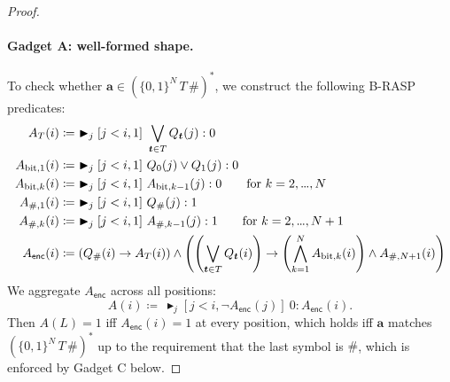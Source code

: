 \documentclass{article} %
\newcommand{\maxatt}{\blacktriangleright}
\newcommand{\enc}{\mathsf{enc}}
\newcommand{\bnfdef}{\coloneqq}
\newcommand{\sym}[1]{\mathrm{#1}}
\newcommand{\str}[1]{#1}
\newcommand{\bword}{\mathbf{a}}
\newcommand{\Qprop}[1]{Q_{#1}}
\newcommand{\kstar}{^*}
\newcommand{\tile}{\boldsymbol{t}}
\newcommand{\tileset}{T}
\newcommand{\mydots}{%
  \ifmmode
    \mathord{.}\mkern-1mu\mathord{.}\mkern-1mu\mathord{.}%
  \else
    .\kern-0.1em.\kern-0.1em.%
  \fi
}
\renewcommand{\dots}{\mydots}%
\begin{document}
\begin{proof}
\paragraph{Gadget A: well-formed shape.}
To check whether $\str{\bword} \in (\{\sym{0},\sym{1}\}^N\, \tileset\, \sym{\#})\kstar$, we construct the following B-RASP predicates:
\begin{subequations}\label{eq:gadget-A}
\begin{align}
A_{\tileset}(i) &\bnfdef\ \maxatt_j[j<i,1]\ \bigvee_{\tile \in \tileset} \Qprop{\tile}(j) : 0 \label{eq:A-T}\\
A_{\mathrm{bit},1}(i) &\bnfdef\ \maxatt_j[j<i,1]\ \Qprop{\sym{0}}(j) \vee \Qprop{\sym{1}}(j) : 0 \label{eq:A-bit-1}\\
A_{\mathrm{bit},k}(i) &\bnfdef\ \maxatt_j[j<i,1]\ A_{\mathrm{bit},k-1}(j) : 0 \qquad \text{for } k = 2,\dots,N \label{eq:A-bit-k}\\
A_{\#,1}(i) &\bnfdef\ \maxatt_j[j<i,1]\ \Qprop{\sym{\#}}(j) : 1 \label{eq:A-h-1}\\
A_{\#,k}(i) &\bnfdef\ \maxatt_j[j<i,1]\ A_{\#,k-1}(j) : 1 \qquad \text{for } k = 2,\dots,N+1 \label{eq:A-h-k}\\
A_{\enc}(i) &\bnfdef \left(\Qprop{\sym{\#}}(i) \to A_{\tileset}(i)\right) \wedge \left(\left(\bigvee_{\tile \in \tileset} \Qprop{\tile}(i)\right) \to \left(\bigwedge_{k=1}^N A_{\mathrm{bit},k}(i)\right) \wedge A_{\#,N+1}(i)\right) \label{eq:A-enc}
\end{align}
\end{subequations}
We aggregate $A_\enc$ across all positions:
\begin{equation}
A(i) \bnfdef\ \maxatt_j[j<i,\neg A_\enc(j)]\ 0 : A_\enc(i).
\end{equation}
Then $A(L) = 1$ iff $A_\enc(i) = 1$ at every position, which holds iff $\str{\bword}$ matches $(\{\sym{0},\sym{1}\}^N\, \tileset\, \sym{\#})\kstar$ up to the requirement that the last symbol is $\sym{\#}$, which is enforced by Gadget C below.


\end{proof}
\end{document}
